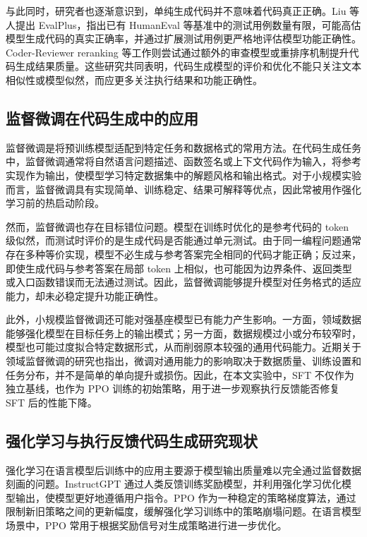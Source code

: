 与此同时，研究者也逐渐意识到，单纯生成代码并不意味着代码真正正确。Liu 等人提出 EvalPlus，指出已有 HumanEval 等基准中的测试用例数量有限，可能高估模型生成代码的真实正确率，并通过扩展测试用例更严格地评估模型功能正确性\cite{Liu2023EvalPlus}。Coder-Reviewer reranking 等工作则尝试通过额外的审查模型或重排序机制提升代码生成结果质量\cite{Zhang2022CoderReviewer}。这些研究共同表明，代码生成模型的评价和优化不能只关注文本相似性或模型似然，而应更多关注执行结果和功能正确性。

\subsection{监督微调在代码生成中的应用}

监督微调是将预训练模型适配到特定任务和数据格式的常用方法。在代码生成任务中，监督微调通常将自然语言问题描述、函数签名或上下文代码作为输入，将参考实现作为输出，使模型学习特定数据集中的解题风格和输出格式。对于小规模实验而言，监督微调具有实现简单、训练稳定、结果可解释等优点，因此常被用作强化学习前的热启动阶段。

然而，监督微调也存在目标错位问题。模型在训练时优化的是参考代码的 token 级似然，而测试时评价的是生成代码是否能通过单元测试。由于同一编程问题通常存在多种等价实现，模型不必生成与参考答案完全相同的代码才能正确；反过来，即使生成代码与参考答案在局部 token 上相似，也可能因为边界条件、返回类型或入口函数错误而无法通过测试。因此，监督微调能够提升模型对任务格式的适应能力，却未必稳定提升功能正确性。

此外，小规模监督微调还可能对强基座模型已有能力产生影响。一方面，领域数据能够强化模型在目标任务上的输出模式；另一方面，数据规模过小或分布较窄时，模型也可能过度拟合特定数据形式，从而削弱原本较强的通用代码能力。近期关于领域监督微调的研究也指出，微调对通用能力的影响取决于数据质量、训练设置和任务分布，并不是简单的单向提升或损伤\cite{Lin2025SFTGeneral}。因此，在本文实验中，SFT 不仅作为独立基线，也作为 PPO 训练的初始策略，用于进一步观察执行反馈能否修复 SFT 后的性能下降。

\subsection{强化学习与执行反馈代码生成研究现状}

强化学习在语言模型后训练中的应用主要源于模型输出质量难以完全通过监督数据刻画的问题。InstructGPT 通过人类反馈训练奖励模型，并利用强化学习优化模型输出，使模型更好地遵循用户指令\cite{Ouyang2022InstructGPT}。PPO 作为一种稳定的策略梯度算法，通过限制新旧策略之间的更新幅度，缓解强化学习训练中的策略崩塌问题\cite{Schulman2017PPO}。在语言模型场景中，PPO 常用于根据奖励信号对生成策略进行进一步优化。

